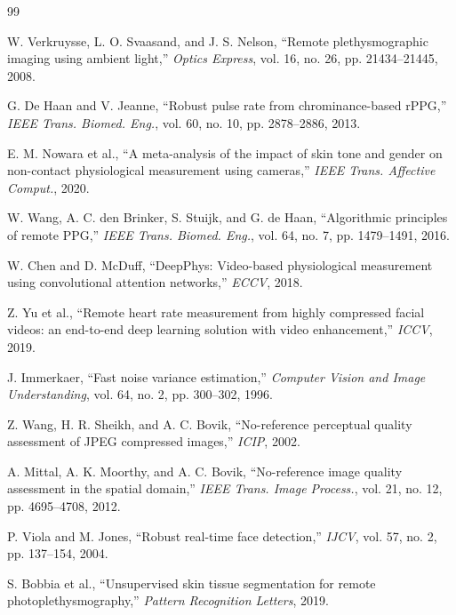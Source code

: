 \documentclass[conference]{IEEEtran}
\begin{document}
\begin{thebibliography}{99}

W. Verkruysse, L. O. Svaasand, and J. S. Nelson, ``Remote plethysmographic imaging using ambient light,'' \emph{Optics Express}, vol. 16, no. 26, pp. 21434--21445, 2008.

G. De Haan and V. Jeanne, ``Robust pulse rate from chrominance-based rPPG,'' \emph{IEEE Trans. Biomed. Eng.}, vol. 60, no. 10, pp. 2878--2886, 2013.

E. M. Nowara et al., ``A meta-analysis of the impact of skin tone and gender on non-contact physiological measurement using cameras,'' \emph{IEEE Trans. Affective Comput.}, 2020.

W. Wang, A. C. den Brinker, S. Stuijk, and G. de Haan, ``Algorithmic principles of remote PPG,'' \emph{IEEE Trans. Biomed. Eng.}, vol. 64, no. 7, pp. 1479--1491, 2016.

W. Chen and D. McDuff, ``DeepPhys: Video-based physiological measurement using convolutional attention networks,'' \emph{ECCV}, 2018.

Z. Yu et al., ``Remote heart rate measurement from highly compressed facial videos: an end-to-end deep learning solution with video enhancement,'' \emph{ICCV}, 2019.

J. Immerkaer, ``Fast noise variance estimation,'' \emph{Computer Vision and Image Understanding}, vol. 64, no. 2, pp. 300--302, 1996.

Z. Wang, H. R. Sheikh, and A. C. Bovik, ``No-reference perceptual quality assessment of JPEG compressed images,'' \emph{ICIP}, 2002.

A. Mittal, A. K. Moorthy, and A. C. Bovik, ``No-reference image quality assessment in the spatial domain,'' \emph{IEEE Trans. Image Process.}, vol. 21, no. 12, pp. 4695--4708, 2012.

P. Viola and M. Jones, ``Robust real-time face detection,'' \emph{IJCV}, vol. 57, no. 2, pp. 137--154, 2004.

S. Bobbia et al., ``Unsupervised skin tissue segmentation for remote photoplethysmography,'' \emph{Pattern Recognition Letters}, 2019.


\end{thebibliography}
\end{document}
